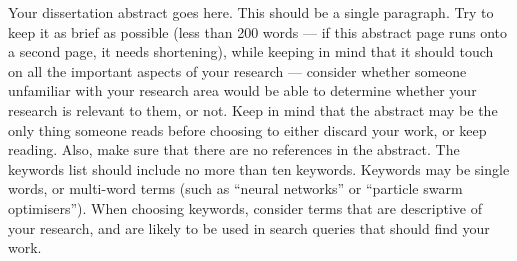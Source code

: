 Your dissertation abstract goes here. This should be a single
paragraph. Try to keep it as brief as possible (less than 200 words
--- if this abstract page runs onto a second page, it needs
shortening), while keeping in mind that it should touch on all the
important aspects of your research --- consider whether someone
unfamiliar with your research area would be able to determine whether
your research is relevant to them, or not. Keep in mind that the
abstract may be the only thing someone reads before choosing to either
discard your work, or keep reading. Also, make sure that there are no
references in the abstract. The keywords list should include no more
than ten keywords. Keywords may be single words, or multi-word terms
(such as ``neural networks'' or ``particle swarm optimisers''). When
choosing keywords, consider terms that are descriptive of your
research, and are likely to be used in search queries that should find
your work.
